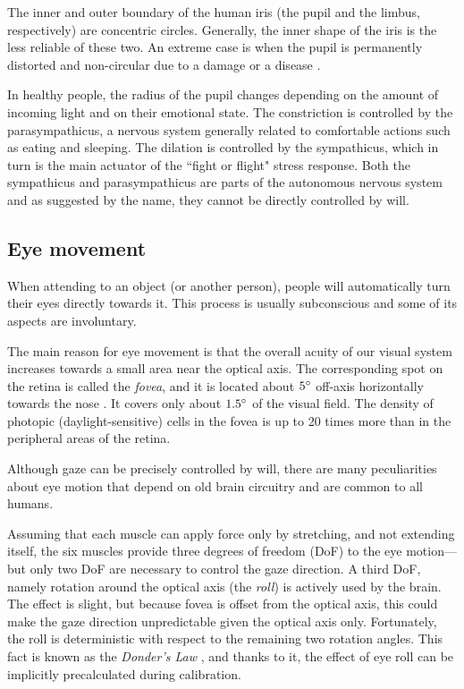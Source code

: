 The inner and outer boundary of the human iris (the pupil and the limbus, respectively) are concentric circles.
Generally, the inner shape of the iris is the less reliable of these two.
An extreme case is when the pupil is permanently distorted and non-circular due to a damage \cite[p.5]{bowyer16} or a disease \cite[p.146]{bowyer16}.

In healthy people, the radius of the pupil changes depending on the amount of incoming light and on their emotional state.
The constriction is controlled by the parasympathicus, a nervous system generally related to comfortable actions such as eating and sleeping.
The dilation is controlled by the sympathicus, which in turn is the main actuator of the ``fight or flight" stress response.
Both the sympathicus and parasympathicus are parts of the autonomous nervous system and as suggested by the name, they cannot be directly controlled by will.

\subsection{Eye movement}

When attending to an object (or another person), people will automatically turn their eyes directly towards it.
This process is usually subconscious and some of its aspects are involuntary.

The main reason for eye movement is that the overall acuity of our visual system increases towards a small area near the optical axis.
The corresponding spot on the retina is called the \textit{fovea}, and it is located about $5\degree$ off-axis horizontally towards the nose \cite{villanueva08}.
It covers only about $1.5\degree$ of the visual field.
The density of photopic (daylight-sensitive) cells in the fovea is up to 20 times more than in the peripheral areas of the retina.

Although gaze can be precisely controlled by will, there are many peculiarities about eye motion that depend on old brain circuitry and are common to all humans.

Assuming that each muscle can apply force only by stretching, and not extending itself, the six muscles provide three degrees of freedom (DoF) to the eye motion---but only two DoF are necessary to control the gaze direction.
A third DoF, namely rotation around the optical axis (the \textit{roll}) is actively used by the brain.
The effect is slight, but because fovea is offset from the optical axis, this could make the gaze direction unpredictable given the optical axis only.
Fortunately, the roll is deterministic with respect to the remaining two rotation angles.
This fact is known as the \textit{Donder's Law} \cite{hansen10}, and thanks to it, the effect of eye roll can be implicitly precalculated during calibration.

